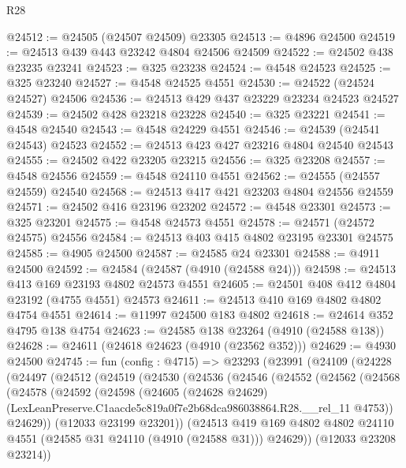 \begin{lexlean}{R28}
\begin{coremodule}
@24512 := @24505 (@24507 @24509) @23305
@24513 := @4896 @24500
@24519 := @24513 @439 @443 @23242 @4804 @24506 @24509
@24522 := @24502 @438 @23235 @23241
@24523 := @325 @23238
@24524 := @4548 @24523
@24525 := @325 @23240
@24527 := @4548 @24525 @4551
@24530 := @24522 (@24524 @24527) @24506
@24536 := @24513 @429 @437 @23229 @23234 @24523 @24527
@24539 := @24502 @428 @23218 @23228
@24540 := @325 @23221
@24541 := @4548 @24540
@24543 := @4548 @24229 @4551
@24546 := @24539 (@24541 @24543) @24523
@24552 := @24513 @423 @427 @23216 @4804 @24540 @24543
@24555 := @24502 @422 @23205 @23215
@24556 := @325 @23208
@24557 := @4548 @24556
@24559 := @4548 @24110 @4551
@24562 := @24555 (@24557 @24559) @24540
@24568 := @24513 @417 @421 @23203 @4804 @24556 @24559
@24571 := @24502 @416 @23196 @23202
@24572 := @4548 @23301
@24573 := @325 @23201
@24575 := @4548 @24573 @4551
@24578 := @24571 (@24572 @24575) @24556
@24584 := @24513 @403 @415 @4802 @23195 @23301 @24575
@24585 := @4905 @24500
@24587 := @24585 @24 @23301
@24588 := @4911 @24500
@24592 := @24584 (@24587 (@4910 (@24588 @24)))
@24598 := @24513 @413 @169 @23193 @4802 @24573 @4551
@24605 := @24501 @408 @412 @4804 @23192 (@4755 @4551) @24573
@24611 := @24513 @410 @169 @4802 @4802 @4754 @4551
@24614 := @11997 @24500 @183 @4802
@24618 := @24614 @352 @4795 @138 @4754
@24623 := @24585 @138 @23264 (@4910 (@24588 @138))
@24628 := @24611 (@24618 @24623 (@4910 (@23562 @352)))
@24629 := @4930 @24500
@24745 := fun (config : @4715) =>
  @23293
    (@23991
      (@24109
        (@24228
          (@24497
            (@24512
              (@24519
                (@24530
                  (@24536
                    (@24546
                      (@24552
                        (@24562
                          (@24568
                            (@24578
                              (@24592
                                (@24598
                                  (@24605
                                    (@24628 @24629)
                                    (LexLeanPreserve.C1aacde5c819a0f7e2b68dca986038864.R28.__rel_11
                                      @4753))
                                  @24629))
                              (@12033 @23199 @23201))
                            (@24513
                              @419
                              @169
                              @4802
                              @4802
                              @24110
                              @4551
                              (@24585 @31 @24110 (@4910 (@24588 @31)))
                              @24629))
                          (@12033 @23208 @23214))

\end{coremodule}
\end{lexlean}
